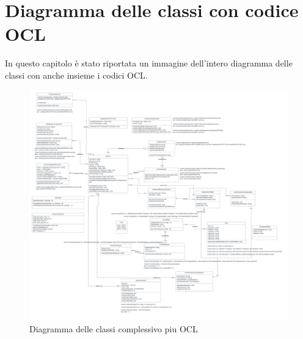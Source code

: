 \section{Diagramma delle classi con codice OCL}
In questo capitolo è stato riportata un immagine dell'intero diagramma delle classi con anche insieme i codici OCL.

\begin{figure}[!h]
\centering
\includegraphics[scale=0.12]{images/diagramma_classi_piu_ocl.png}
\caption{Diagramma delle classi complessivo piu OCL}
\label{fig:diagramma_delle_classi_complessivo_piu_OCL}
\end{figure}
\noindent